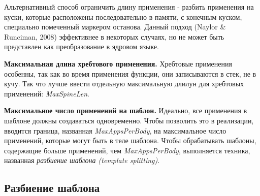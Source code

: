 \documentclass[flenqn, 14pt]{extarticle}
\begin{document}
Альтернативный способ ограничить длину применения - разбить применения на куски, которые расположены последовательно в памяти, с конечным куском, специально помеченный маркером останова. Данный подход (Naylor \& Runciman, 2008) эффективнее в некоторых случаях, но не может быть представлен как преобразование в ядровом языке.

\textbf{Максимальная длина хребтового применения.} Хребтовые применения особенны, так как во время применения функции, они записываются в стек, не в кучу. Так что лучше ввести отдельную максимальную длилун для хребтовых применений: \textit{MaxSpineLen}.

\textbf{Максимальное число применений на шаблон.} Идеально, все применения в шаблоне должны создаваться одновременно. Чтобы позволить это в реализации, вводится граница, названная \textit{MaxAppsPerBody}, на максимальное число применений, которые могут быть в теле шаблона. Чтобы обрабатывать шаблоны, содержащие больше применений, чем \textit{MaxAppsPerBody}, выполняется техника, названная \textit{разбиение шаблона (template splitting)}.

\subsection{Разбиение шаблона}
 
\end{document}
